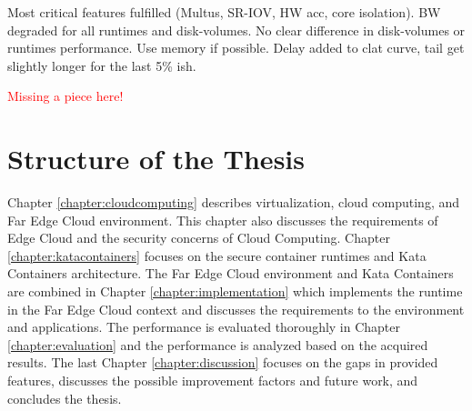 Most critical features fulfilled (Multus, SR-IOV, HW acc, core isolation).
BW degraded for all runtimes and disk-volumes. No clear difference in disk-volumes or runtimes performance.
Use memory if possible.
Delay added to clat curve, tail get slightly longer for the last 5\% ish.

\textcolor{red}{Missing a piece here!}

\section{Structure of the Thesis}
\label{section:intro_structure}

Chapter \ref{chapter:cloudcomputing} describes virtualization, cloud computing, and Far Edge Cloud environment. This chapter also discusses the requirements of Edge Cloud and the security concerns of Cloud Computing. Chapter \ref{chapter:katacontainers} focuses on the secure container runtimes and Kata Containers architecture. The Far Edge Cloud environment and Kata Containers are combined in Chapter \ref{chapter:implementation} which implements the runtime in the Far Edge Cloud context and discusses the requirements to the environment and applications. The performance is evaluated thoroughly in Chapter \ref{chapter:evaluation} and the performance is analyzed based on the acquired results. The last Chapter \ref{chapter:discussion} focuses on the gaps in provided features, discusses the possible improvement factors and future work, and concludes the thesis.